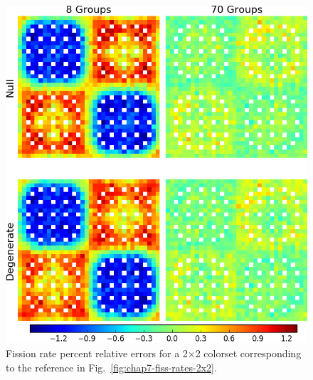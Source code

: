 \begin{figure}[h!]
\centering
\includegraphics[width=\linewidth]{figures/quantification/2x2/fiss-err}
\vspace{2mm}
\caption[Fission rate errors for a 2$\times$2 colorset]{Fission rate percent relative errors for a 2$\times$2 colorset corresponding to the reference in Fig.~\ref{fig:chap7-fiss-rates-2x2}.}
\label{fig:chap8-2x2-fiss-err}
\end{figure}

\clearpage

